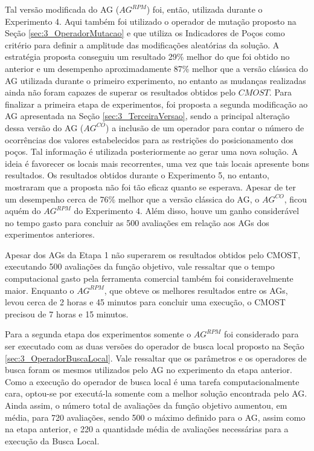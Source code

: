 Tal versão modificada do AG ($AG^{RPM}$) foi, então, utilizada durante o Experimento 4. Aqui também foi utilizado o operador de mutação proposto na Seção \ref{sec:3_OperadorMutacao} e que utiliza os Indicadores de Poços como critério para definir a amplitude das modificações aleatórias da solução. A estratégia proposta conseguiu um resultado 29\% melhor do que foi obtido no anterior e um desempenho aproximadamente 87\% melhor que a versão clássica do AG utilizada durante o primeiro experimento, no entanto as mudanças realizadas ainda não foram capazes de superar os resultados obtidos pelo $CMOST$. Para finalizar a primeira etapa de experimentos, foi proposta a segunda modificação ao AG apresentada na Seção \ref{sec:3_TerceiraVersao}, sendo a principal alteração dessa versão do AG ($AG^{CO}$) a inclusão de um operador para contar o número de ocorrências dos valores estabelecidos para as restrições do posicionamento dos poços. Tal informação é utilizada posteriormente ao gerar uma nova solução. A ideia é favorecer os locais mais recorrentes, uma vez que tais locais apresente bons resultados. Os resultados obtidos durante o Experimento 5, no entanto, mostraram que a proposta não foi tão eficaz quanto se esperava. Apesar de ter um desempenho cerca de 76\% melhor que a versão clássica do AG, o $AG^{CO}$, ficou aquém do $AG^{RPM}$ do Experimento 4. Além disso, houve um ganho considerável no tempo gasto para concluir as 500 avaliações em relação aos AGs dos experimentos anteriores.

Apesar dos AGs da Etapa 1 não superarem os resultados obtidos pelo CMOST, executando 500 avaliações da função objetivo, vale ressaltar que o tempo computacional gasto pela ferramenta comercial também foi consideravelmente maior. Enquanto o $AG^{RPM}$, que obteve os melhores resultados entre os AGs, levou cerca de 2 horas e 45 minutos para concluir uma execução, o CMOST precisou de 7 horas e 15 minutos.

Para a segunda etapa dos experimentos somente o $AG^{RPM}$ foi considerado para ser executado com as duas versões do operador de busca local proposto na Seção \ref{sec:3_OperadorBuscaLocal}. Vale ressaltar que os parâmetros e os operadores de busca foram os mesmos utilizados pelo AG no experimento da etapa anterior. Como a execução do operador de busca local é uma tarefa computacionalmente cara, optou-se por executá-la somente com a melhor solução encontrada pelo AG. Ainda assim, o número total de avaliações da função objetivo aumentou, em média, para 720 avaliações, sendo 500 o máximo definido para o AG, assim como na etapa anterior, e 220 a quantidade média de avaliações necessárias para a execução da Busca Local.

